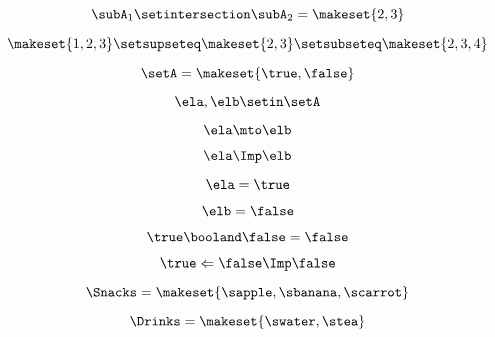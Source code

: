\begin{forslides}
    \begin{equation}
        \label{eq:feedback-029}
        \subA_1 \setintersection \subA_2 = \makeset{2, 3 }
    \end{equation}

    \begin{equation}
        \label{eq:feedback-030}
        \makeset{ 1, 2, 3 } \setsupseteq \makeset{2, 3 } \setsubseteq \makeset{2, 3, 4 }
    \end{equation}

    \begin{equation}
        \label{eq:feedback-031}
        \setA = \makeset{ \true, \false }
    \end{equation}

    \begin{equation}
        \label{eq:feedback-032}
        \ela, \elb  \setin \setA
    \end{equation}

    \begin{equation}
        \label{eq:feedback-033}
        \ela \mto \elb
    \end{equation}

    \begin{equation}
        \label{eq:feedback-034}
        \ela \Imp \elb
    \end{equation}

    \begin{equation}
        \label{eq:feedback-035}
        \ela = \true
    \end{equation}

    \begin{equation}
        \label{eq:feedback-036}
        \elb= \false
    \end{equation}

    \begin{equation}
        \label{eq:feedback-037}
        \true \booland \false = \false
    \end{equation}

    \begin{equation}
        \label{eq:feedback-038}
        \true \Leftarrow \false \Imp \false
    \end{equation}

    \begin{equation}
        \label{eq:feedback-039}
        \Snacks=\makeset{\sapple,\sbanana,\scarrot}
    \end{equation}

    \begin{equation}
        \label{eq:feedback-040}
        \Drinks=\makeset{\swater,\stea}
    \end{equation}


\end{forslides}
